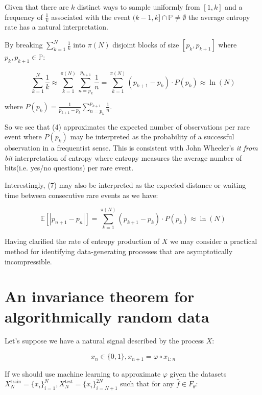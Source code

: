 \documentclass{article}
\begin{document}
Given that there are $k$ distinct ways to sample uniformly from $[1,k]$ and a frequency of $\frac{1}{k}$ associated with the event $(k-1,k] \cap \mathbb{P} \neq \emptyset$ the average entropy rate has a natural interpretation. 

By breaking $\sum_{k=1}^N \frac{1}{k}$ into $\pi(N)$ disjoint blocks of size $[p_k,p_{k+1}]$ where $p_k, p_{k+1} \in \mathbb{P}$: 

\begin{equation}
\sum_{k=1}^N \frac{1}{k}	 \approx \sum_{k=1}^{\pi(N)} \sum_{n=p_k}^{p_{k+1}} \frac{1}{n} = \sum_{k=1}^{\pi(N)} (p_{k+1}-p_k) \cdot P(p_k) \approx \ln(N)
\end{equation}

where $P(p_k)= \frac{1}{p_{k+1}-p_k}\sum_{n=p_k}^{p_{k+1}} \frac{1}{n}$. 

So we see that (4) approximates the expected number of observations per rare event where $P(p_k)$ may be interpreted as the probability of a successful observation in a frequentist sense. This is consistent with John Wheeler's \textit{it from bit} interpretation of entropy where entropy measures the average number of bits(i.e. yes/no questions) per rare event. 

Interestingly, (7) may also be interpreted as the expected distance or waiting time between consecutive rare events as we have: 

\begin{equation}
\mathbb{E}[|p_{n+1} -p_n|] = \sum_{k=1}^{\pi(N)} (p_{k+1}-p_k) \cdot P(p_k) \approx \ln(N) 	
\end{equation}

Having clarified the rate of entropy production of $X$ we may consider a practical method for identifying data-generating processes that are asymptotically incompressible. 

\newpage

\section{An invariance theorem for algorithmically random data}

Let's suppose we have a natural signal described by the process $X$: 

\begin{equation}
x_n \in \{0,1\}, x_{n+1} = \varphi \circ x_{1:n}	
\end{equation}

If we should use machine learning to approximate $\varphi$ given the datasets 
$X_N^{\text{train}}= \{x_i\}_{i=1}^N,X_N^{\text{test}}= \{x_i\}_{i=N+1}^{2N}$
such that for any $\hat{f} \in F_{\theta}$: 
\end{document}
